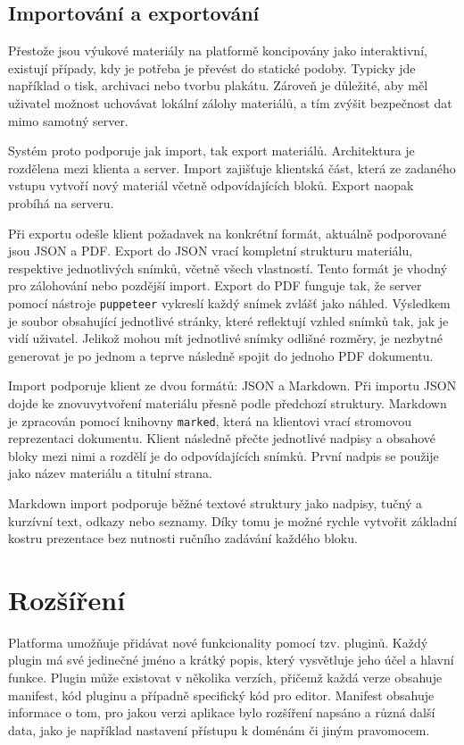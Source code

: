 \subsection{Importování a exportování}

Přestože jsou výukové materiály na platformě koncipovány jako interaktivní, existují případy, kdy je potřeba je převést do statické podoby.
Typicky jde například o tisk, archivaci nebo tvorbu plakátu. 
Zároveň je důležité, aby měl uživatel možnost uchovávat lokální zálohy materiálů, a tím zvýšit bezpečnost dat mimo samotný server.

Systém proto podporuje jak import, tak export materiálů. 
Architektura je rozdělena mezi klienta a server. 
Import zajišťuje klientská část, která ze zadaného vstupu vytvoří nový materiál včetně odpovídajících bloků. 
Export naopak probíhá na serveru.

Při exportu odešle klient požadavek na konkrétní formát, aktuálně podporované jsou JSON a PDF. 
Export do JSON vrací kompletní strukturu materiálu, respektive jednotlivých snímků, včetně všech vlastností. 
Tento formát je vhodný pro zálohování nebo pozdější import. 
Export do PDF funguje tak, že server pomocí nástroje \texttt{puppeteer} vykreslí každý snímek zvlášť jako náhled. 
Výsledkem je soubor obsahující jednotlivé stránky, které reflektují vzhled snímků tak, jak je vidí uživatel.
Jelikož mohou mít jednotlivé snímky odlišné rozměry, je nezbytné generovat je po jednom a teprve následně spojit do jednoho PDF dokumentu.

Import podporuje klient ze dvou formátů: JSON a Markdown. 
Při importu JSON dojde ke znovuvytvoření materiálu přesně podle předchozí struktury. 
Markdown je zpracován pomocí knihovny \texttt{marked}, která na klientovi vrací stromovou reprezentaci dokumentu. 
Klient následně přečte jednotlivé nadpisy a obsahové bloky mezi nimi a rozdělí je do odpovídajících snímků. 
První nadpis se použije jako název materiálu a titulní strana.

Markdown import podporuje běžné textové struktury jako nadpisy, tučný a kurzívní text, odkazy nebo seznamy. 
Díky tomu je možné rychle vytvořit základní kostru prezentace bez nutnosti ručního zadávání každého bloku.

\section{Rozšíření}

Platforma umožňuje přidávat nové funkcionality pomocí tzv. pluginů. 
Každý plugin má své jedinečné jméno a krátký popis, který vysvětluje jeho účel a hlavní funkce. 
Plugin může existovat v několika verzích, přičemž každá verze obsahuje manifest, kód pluginu a případně specifický kód pro editor.
Manifest obsahuje informace o tom, pro jakou verzi aplikace bylo rozšíření napsáno a různá další data, jako je například nastavení přístupu k doménám či jiným pravomocem.

